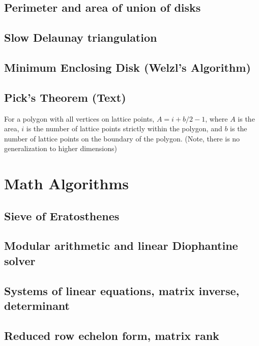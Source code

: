 \documentclass[9pt]{extarticle}
\begin{document}
\begin{multicols}{3}
\subsection{Perimeter and area of union of disks}


\subsection{Slow Delaunay triangulation}


\subsection{Minimum Enclosing Disk (Welzl's Algorithm)}


\subsection{Pick's Theorem (Text)}

For a polygon with all vertices on lattice points, $A = i + b/2 - 1$, where $A$ is the area, $i$ is the number of lattice points strictly within the polygon, and $b$ is the number of lattice points on the boundary of the polygon. (Note, there is no generalization to higher dimensions)

\section{Math Algorithms}

\subsection{Sieve of Eratosthenes}


\subsection{Modular arithmetic and linear Diophantine solver}


\subsection{Systems of linear equations, matrix inverse, determinant}


\subsection{Reduced row echelon form, matrix rank}



\end{multicols}
\end{document}
